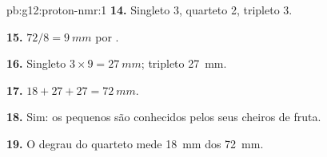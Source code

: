\begin{solution}{pb:g12:proton-nmr:1}
\textbf{14.} Singleto 3, quarteto 2, tripleto 3.

\textbf{15.} $72 / 8 = \qty{9}{mm}$ por .

\textbf{16.} Singleto $3 \times 9 = \qty{27}{mm}$; tripleto
\qty{27}{mm}.

\textbf{17.} $18 + 27 + 27 = \qty{72}{mm}$.

\textbf{18.} Sim: os  pequenos são conhecidos pelos seus cheiros
de fruta.

\textbf{19.} O degrau do quarteto mede \qty{18}{mm} dos \qty{72}{mm}.
\end{solution}
